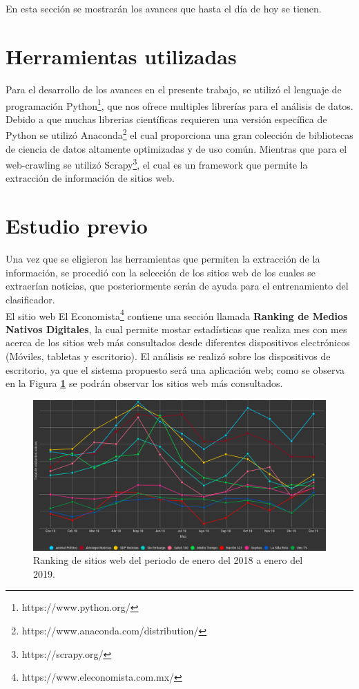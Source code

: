 \ \\\\
En esta sección se mostrarán los avances que hasta el día de hoy se tienen.

\section{Herramientas utilizadas}
Para el desarrollo de los avances en el presente trabajo, se utilizó el lenguaje de programación Python\footnote{https://www.python.org/}, 
que nos ofrece multiples librerías para el análisis de datos. Debido a que muchas librerias científicas requieren una versión específica 
de Python se utilizó Anaconda\footnote{https://www.anaconda.com/distribution/} el cual proporciona una gran colección de bibliotecas de 
ciencia de datos altamente optimizadas y de uso común. Mientras que para el web-crawling se utilizó Scrapy\footnote{https://scrapy.org/}, 
el cual es un framework que permite la extracción de información de sitios web.

\section{Estudio previo}
Una vez que se eligieron las herramientas que permiten la extracción de la información, se procedió con la selección de los 
sitios web de los cuales se extraerían noticias, que posteriormente serán de ayuda para el entrenamiento del clasificador.
\\
El sitio web El Economista\footnote{https://www.eleconomista.com.mx/} contiene una sección llamada \textbf{Ranking de Medios Nativos Digitales}, 
la cual permite mostar estadísticas que realiza mes con mes acerca de los sitios web más consultados desde diferentes dispositivos electrónicos 
(Móviles, tabletas y escritorio).
El análisis se realizó sobre los dispositivos de escritorio, ya que el sistema propuesto será una aplicación web; como se observa en la Figura
 \textbf{\ref{fig:rank}} se podrán observar los sitios web más consultados.
\begin{figure}[H]
  \centering
  \includegraphics[scale=.28]{imagenes/Capitulo5/ranking}
  \caption{Ranking de sitios web del periodo de enero del 2018 a enero del 2019.}
  \label{fig:rank}
\end{figure}

